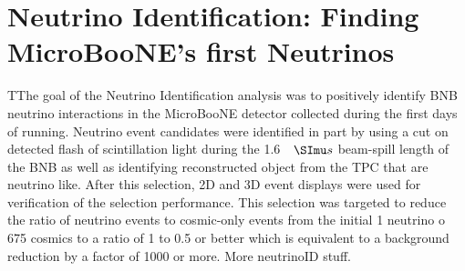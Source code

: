\chapter{Neutrino Identification: Finding MicroBooNE's first Neutrinos} \label{ch:neutrinoID}
TThe goal of the Neutrino Identification analysis was to positively identify BNB neutrino interactions in the MicroBooNE detector collected during the first days of running. Neutrino event candidates were identified in part by using a cut on detected flash of scintillation light during the 1.6 $\micro s$ beam-spill length of the BNB as well as identifying reconstructed object from the TPC that are neutrino like. After this selection, 2D and 3D event displays were used for verification of the selection performance. This selection was targeted to reduce the ratio of neutrino events to cosmic-only events from the initial 1 neutrino o 675 cosmics to a ratio of 1 to 0.5 or better which is equivalent to a background reduction by a factor of 1000 or more.   
\clearpage
More neutrinoID stuff.
